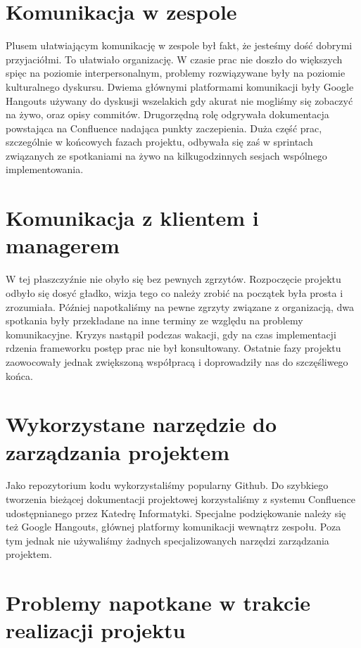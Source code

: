 \section{Komunikacja w zespole}
Plusem ułatwiającym komunikację w zespole był fakt, że jesteśmy dość dobrymi przyjaciółmi. To ułatwiało organizację. W czasie prac nie doszło do większych spięc na poziomie interpersonalnym, problemy rozwiązywane były na poziomie kulturalnego dyskursu. Dwiema głównymi platformami komunikacji były Google Hangouts używany do dyskusji wszelakich gdy akurat nie mogliśmy się zobaczyć na żywo, oraz opisy commitów. Drugorzędną rolę odgrywała dokumentacja powstająca na Confluence nadająca punkty zaczepienia. Duża część prac, szczególnie w końcowych fazach projektu, odbywała się zaś w sprintach związanych ze spotkaniami na żywo na kilkugodzinnych sesjach wspólnego implementowania.

\section{Komunikacja z klientem i managerem}
W tej płaszczyźnie nie obyło się bez pewnych zgrzytów. Rozpoczęcie projektu odbyło się dosyć gładko, wizja tego co należy zrobić na początek była prosta i zrozumiała. Później napotkaliśmy na pewne zgrzyty związane z organizacją, dwa spotkania były przekładane na inne terminy ze względu na problemy komunikacyjne. Kryzys nastąpił podczas wakacji, gdy na czas implementacji rdzenia frameworku postęp prac nie był konsultowany. Ostatnie fazy projektu zaowocowały jednak zwiększoną współpracą i doprowadziły nas do szczęśliwego końca.

\section{Wykorzystane narzędzie do zarządzania projektem}
Jako repozytorium kodu wykorzystaliśmy popularny Github. Do szybkiego tworzenia bieżącej dokumentacji projektowej korzystaliśmy z systemu Confluence udostępnianego przez Katedrę Informatyki. Specjalne podziękowanie należy się też Google Hangouts, głównej platformy komunikacji wewnątrz zespołu. Poza tym jednak nie używaliśmy żadnych specjalizowanych narzędzi zarządzania projektem.

\section{Problemy napotkane w trakcie realizacji projektu}
\label{problem}

